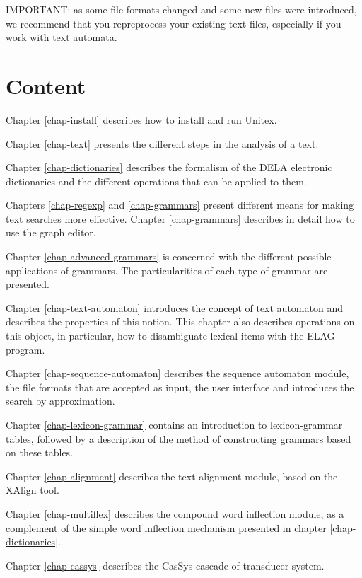 \bigskip
\noindent IMPORTANT: as some file formats changed and some new files were introduced, we recommend that you
repreprocess your existing text files, especially if you work with text
automata.

\section*{Content}
\noindent Chapter \ref{chap-install} describes how to install and run
Unitex.

\bigskip \noindent Chapter \ref{chap-text} presents the different steps in the
analysis of  a text.

\bigskip \noindent Chapter \ref{chap-dictionaries} describes the formalism of
the DELA electronic dictionaries and the different operations that can be applied to them.

\bigskip \noindent Chapters \ref{chap-regexp} and \ref{chap-grammars}
present different means for making text searches more effective. 
Chapter \ref{chap-grammars} describes in detail how to use the graph
editor.

\bigskip \noindent Chapter \ref{chap-advanced-grammars} is concerned
with the different possible applications of grammars. The particularities of each type of grammar are
presented.

\bigskip \noindent Chapter \ref{chap-text-automaton} introduces the 
concept of text automaton and describes the properties of this notion. This chapter also describes 
operations on this object, in particular, how to disambiguate lexical items with
the ELAG program.

\bigskip \noindent Chapter \ref{chap-sequence-automaton} describes the sequence automaton module, the file formats that are accepted as input, the user interface and introduces the search by approximation.

\bigskip \noindent Chapter \ref{chap-lexicon-grammar} contains an
introduction to lexicon-grammar tables, followed by a description of the method of constructing grammars based on these
tables.

\bigskip \noindent Chapter \ref{chap-alignment} describes the text
alignment module, based on the XAlign tool.

\bigskip \noindent Chapter \ref{chap-multiflex} describes the compound word
inflection module, as a complement of the simple word inflection mechanism
presented in chapter \ref{chap-dictionaries}.

\bigskip \noindent Chapter \ref{chap-cassys} describes the CasSys cascade of transducer system.

